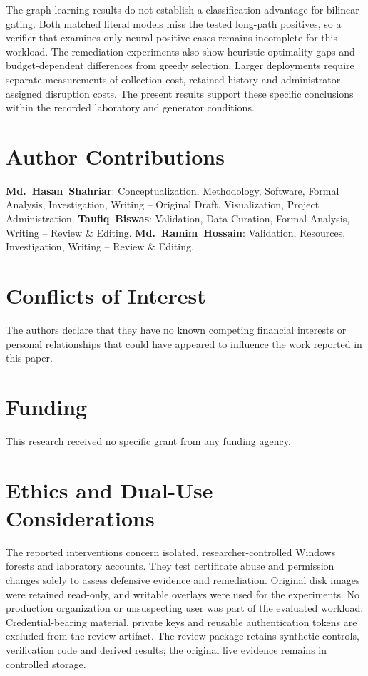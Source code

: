 The graph-learning results do not establish a classification advantage for bilinear gating. Both matched literal models miss the tested long-path positives, so a verifier that examines only neural-positive cases remains incomplete for this workload. The remediation experiments also show heuristic optimality gaps and budget-dependent differences from greedy selection. Larger deployments require separate measurements of collection cost, retained history and administrator-assigned disruption costs. The present results support these specific conclusions within the recorded laboratory and generator conditions.

\section*{Author Contributions}
\noindent\textbf{Md.~Hasan~Shahriar}: Conceptualization, Methodology, Software, Formal Analysis, Investigation, Writing -- Original Draft, Visualization, Project Administration.
\textbf{Taufiq~Biswas}: Validation, Data Curation, Formal Analysis, Writing -- Review \& Editing.
\textbf{Md.~Ramim~Hossain}: Validation, Resources, Investigation, Writing -- Review \& Editing.

\section*{Conflicts of Interest}
\noindent The authors declare that they have no known competing financial interests or personal relationships that could have appeared to influence the work reported in this paper.

\section*{Funding}
\noindent This research received no specific grant from any funding agency.

\section*{Ethics and Dual-Use Considerations}
\noindent The reported interventions concern isolated, researcher-controlled Windows forests and laboratory accounts. They test certificate abuse and permission changes solely to assess defensive evidence and remediation. Original disk images were retained read-only, and writable overlays were used for the experiments. No production organization or unsuspecting user was part of the evaluated workload. Credential-bearing material, private keys and reusable authentication tokens are excluded from the review artifact. The review package retains synthetic controls, verification code and derived results; the original live evidence remains in controlled storage.

